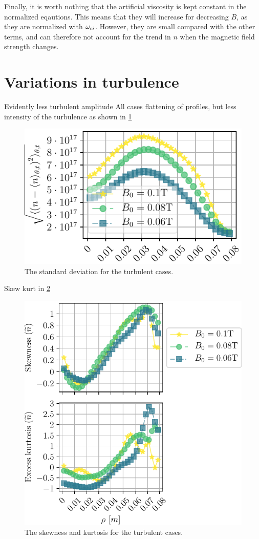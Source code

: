 Finally, it is worth nothing that the artificial viscosity is kept constant in the normalized eqautions.
This means that they will increase for decreasing $B$, as they are normalized with $\omega_{ci}$.
However, they are small compared with the other terms, and can therefore not account for the trend in $n$ when the magnetic field strength changes.

\section{Variations in turbulence}
%
Evidently less turbulent amplitude
All cases flattening of profiles, but less intensity of the turbulence as shown in \cref{fig:BScanPosOfFluct}
%
\begin{figure}[htb]
    \centering
    \includegraphics{fig/results/bScan/BScanPosOfFluct}
    \caption{The standard deviation for the turbulent cases.}
    \label{fig:BScanPosOfFluct}
\end{figure}
%
Skew kurt in \cref{fig:BScanSkewKurt}
%
\begin{figure}[htb]
    \centering
    \includegraphics{fig/results/bScan/BScanSkewKurt}
    \caption{The skewness and kurtosis for the turbulent cases.}
    \label{fig:BScanSkewKurt}
\end{figure}
